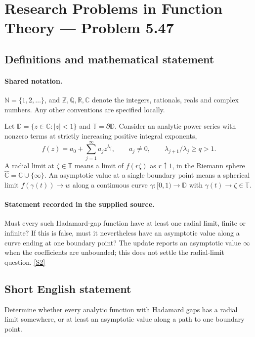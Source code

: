 \documentclass[11pt]{book}
\newcommand{\sref}[2]{\hyperlink{source:#1:#2}{[S#2]}}
\begin{document}
\section{Research Problems in Function Theory — Problem 5.47}\label{statement}

\subsection{Definitions and mathematical statement}

\paragraph{Shared notation.}$\mathbb N=\{1,2,\ldots\}$, and $\mathbb Z,\mathbb Q,\mathbb R,\mathbb C$ denote the integers, rationals, reals and complex numbers. Any other conventions are specified locally.


Let $\mathbb D=\{z\in\mathbb C:|z|<1\}$ and $\mathbb T=\partial\mathbb D$. Consider an analytic power series with nonzero terms at strictly increasing positive integral exponents, \[f(z)=a_0+\sum_{j=1}^{\infty}a_jz^{\lambda_j},\qquad a_j\ne0,\qquad\lambda_{j+1}/\lambda_j\ge q>1.\] A radial limit at $\zeta\in\mathbb T$ means a limit of $f(r\zeta)$ as $r\uparrow1$, in the Riemann sphere $\widehat{\mathbb C}=\mathbb C\cup\{\infty\}$. An asymptotic value at a single boundary point means a spherical limit $f(\gamma(t))\to w$ along a continuous curve $\gamma:[0,1)\to\mathbb D$ with $\gamma(t)\to\zeta\in\mathbb T$.
\paragraph{Statement recorded in the supplied source.}
Must every such Hadamard-gap function have at least one radial limit, finite or infinite? If this is false, must it nevertheless have an asymptotic value along a curve ending at one boundary point? The update reports an asymptotic value $\infty$ when the coefficients are unbounded; this does not settle the radial-limit question. \sref{statement}{2}
\subsection{Short English statement}
Determine whether every analytic function with Hadamard gaps has a radial limit somewhere, or at least an asymptotic value along a path to one boundary point.
\end{document}
